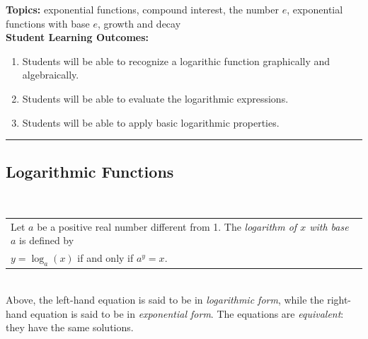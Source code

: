 

\noindent \textbf{Topics:}  exponential functions, compound interest, the number $e$, exponential functions with base $e$, growth and decay\\

\noindent \textbf{Student Learning Outcomes:}
\begin{enumerate}
\item Students will be able to recognize a logarithic function graphically and algebraically.
\item Students will be able to evaluate the logarithmic expressions.
\item Students will be able to apply basic logarithmic properties.
\end{enumerate}

\hrule 

\bigskip

\subsection{Logarithmic Functions} ~

\noindent\begin{tabular}{ | l  |} \hline
\noindent  Let $a$ be a positive real number different from 1. The \emph{logarithm of $x$ with base $a$} is defined by   \\
\hspace{1.5in} $y = \log_a(x)$    if and only if   $a^y=x$. \\  \hline
\end{tabular} \\

\noindent Above, the left-hand equation is said to be in
\emph{logarithmic form}, while the right-hand equation is said to be
in \emph{exponential form}. The equations are \emph{equivalent}: they
have the same solutions.

